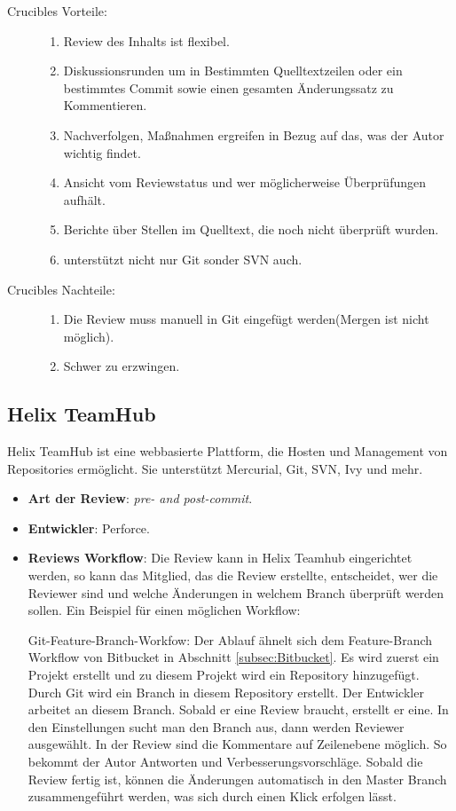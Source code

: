 \begin{description}
	\item [Crucibles Vorteile:] \hfill
	\begin{enumerate}
		\item Review des Inhalts ist flexibel.
		\item Diskussionsrunden um in Bestimmten Quelltextzeilen oder ein bestimmtes Commit sowie einen gesamten Änderungssatz zu Kommentieren.
		\item Nachverfolgen, Maßnahmen ergreifen in Bezug auf das, was der Autor wichtig findet.
		\item Ansicht vom Reviewstatus und wer möglicherweise Überprüfungen aufhält.
		\item Berichte über Stellen im Quelltext, die noch nicht überprüft wurden.
		\item unterstützt nicht nur Git sonder SVN auch.
	\end{enumerate}
	
	\item [Crucibles Nachteile:] \hfill
	\begin{enumerate}
		\item Die Review muss manuell in Git eingefügt werden(Mergen ist nicht möglich).
		\item Schwer zu erzwingen.
	\end{enumerate}
\end{description}

\subsection{Helix TeamHub}
\label{subsec:HelixTeamHub}

Helix TeamHub ist eine webbasierte Plattform, die Hosten und Management von Repositories ermöglicht. Sie unterstützt Mercurial, Git, SVN, Ivy und mehr.

\begin{itemize}
	\item \textbf{Art der Review}: \textit{pre- and post-commit}.
	\item \textbf{Entwickler}: Perforce. 
	\item \textbf{Reviews Workflow}: Die Review kann in Helix Teamhub eingerichtet werden, so kann das Mitglied, das die Review erstellte, entscheidet, wer die Reviewer
		 sind und welche Änderungen in welchem Branch überprüft werden sollen.
		 Ein Beispiel für einen möglichen Workflow:
		 
		  Git-Feature-Branch-Workfow: Der Ablauf ähnelt sich dem Feature-Branch Workflow von Bitbucket in Abschnitt \ref{subsec:Bitbucket}.
		  Es wird zuerst ein Projekt erstellt und zu diesem Projekt wird ein Repository hinzugefügt. Durch Git wird ein Branch in diesem Repository
		  erstellt. Der Entwickler arbeitet an diesem Branch. Sobald er eine Review braucht, erstellt er eine. In den Einstellungen sucht man den Branch aus, dann werden Reviewer
		  ausgewählt. In der Review sind die Kommentare auf Zeilenebene möglich. So bekommt der Autor Antworten und Verbesserungsvorschläge. Sobald die Review fertig ist,
		  können die Änderungen automatisch in den Master Branch zusammengeführt werden, was sich durch einen Klick erfolgen lässt. 
\end{itemize}

